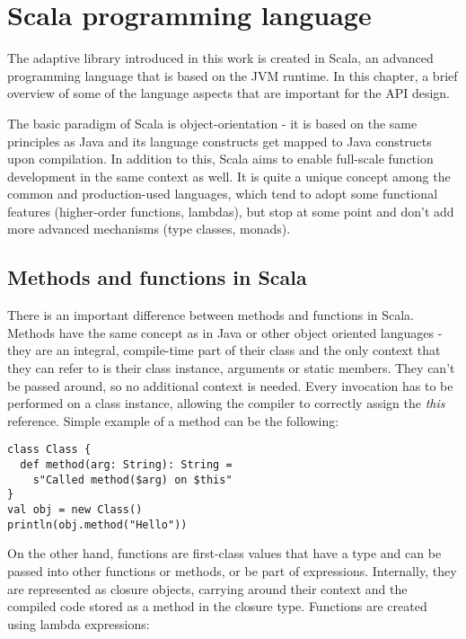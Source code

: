 \chapter{Scala programming language}

The adaptive library introduced in this work is created in Scala, an advanced programming language that is based on the JVM runtime. In this chapter, a brief overview of some of the language aspects that are important for the API design.

The basic paradigm of Scala is object-orientation - it is based on the same principles as Java and its language constructs get mapped to Java constructs upon compilation. In addition to this, Scala aims to enable full-scale function development in the same context as well. It is quite a unique concept among the common and production-used languages, which tend to adopt some functional features (higher-order functions, lambdas), but stop at some point and don't add more advanced mechanisms (type classes, monads).

\section{Methods and functions in Scala}
\label{sec:metandfun}

There is an important difference between methods and functions in Scala. Methods have the same concept as in Java or other object oriented languages - they are an integral, compile-time part of their class and the only context that they can refer to is their class instance, arguments or static members. They can't be passed around, so no additional context is needed. Every invocation has to be performed on a class instance, allowing the compiler to correctly assign the \textit{this} reference. Simple example of a method can be the following:

\lstset{style=Scala}
\begin{lstlisting}
class Class {
  def method(arg: String): String = 
    s"Called method($arg) on $this"
}
val obj = new Class()
println(obj.method("Hello"))
\end{lstlisting}

On the other hand, functions are first-class values that have a type and can be passed into other functions or methods, or be part of expressions. Internally, they are represented as closure objects, carrying around their context and the compiled code stored as a method in the closure type. Functions are created using lambda expressions:

